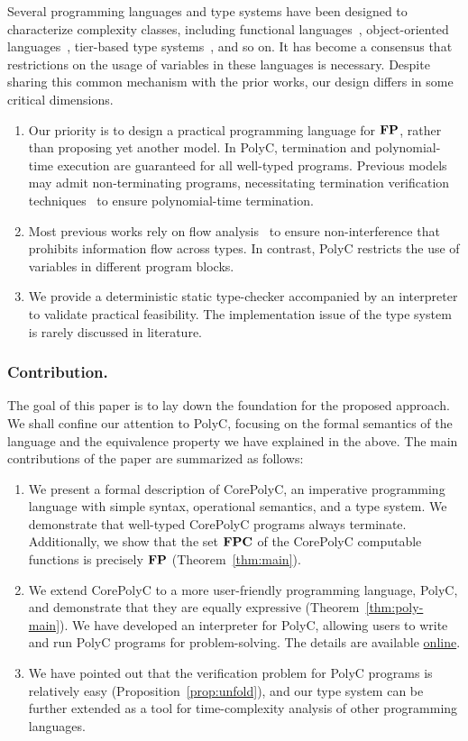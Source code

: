 \documentclass[runningheads]{llncs}
\begin{document}
Several programming languages and type systems have been designed to characterize complexity classes, including functional languages~\cite{jones1999logspace}, object-oriented languages~\cite{hainry2023general}, tier-based type systems~\cite{marion2011type}, and so on.
It has become a consensus that restrictions on the usage of variables in these languages is necessary. 
Despite sharing this common mechanism with the prior works, our design differs in some critical dimensions.
\begin{enumerate}
    \item Our priority is to design a practical programming language for $\mathbf{FP}$, rather than proposing yet another model.
    In PolyC, termination and polynomial-time execution are guaranteed for all well-typed programs. 
    Previous models~\cite{marion2011type,hainry2023general} may admit non-terminating programs, necessitating termination verification techniques~\cite{lee2001size,kuwahara2014automatic} to ensure polynomial-time termination.
    \item Most previous works rely on flow analysis~\cite{volpano2000} to ensure non-interference that prohibits information flow across types. 
    In contrast, PolyC restricts the use of variables in different program blocks.
    \item We provide a deterministic static type-checker accompanied by an interpreter to validate practical feasibility. 
    The implementation issue of the type system is rarely discussed in literature.
\end{enumerate}

\subsubsection{Contribution.}
The goal of this paper is to lay down the foundation for the proposed approach.
We shall confine our attention to {PolyC}, focusing on the formal semantics of the language and the equivalence property we have explained in the above.
The main contributions of the paper are summarized as follows:
\begin{enumerate}
    \item  We present a formal description of CorePolyC, an imperative programming language with simple syntax, operational semantics, and a type system. We demonstrate that well-typed CorePolyC programs always terminate. Additionally, we show that the set $\mathbf{FPC}$ of the CorePolyC computable functions is precisely $\mathbf{FP}$ (Theorem~\ref{thm:main}).
    \item We extend CorePolyC to a more user-friendly programming language, PolyC, and demonstrate that they are equally expressive (Theorem~\ref{thm:poly-main}).
    We have developed an interpreter for PolyC, allowing users to write and run PolyC programs for problem-solving. 
    The details are available \href{https://github.com/AzureSkyChen/polyc}{online}.
    \item We have pointed out that the verification problem for PolyC programs is relatively easy (Proposition~\ref{prop:unfold}), and our type system can be further extended as a tool for time-complexity analysis of other programming languages.
\end{enumerate}
\end{document}
